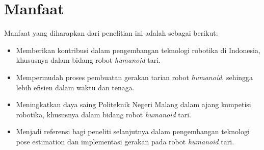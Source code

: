 \section{Manfaat}
Manfaat yang diharapkan dari penelitian ini adalah sebagai berikut:
\begin{itemize}
    \item Memberikan kontribusi dalam pengembangan teknologi robotika di Indonesia, khususnya dalam bidang robot \textit{humanoid} tari.
    \item Mempermudah proses pembuatan gerakan tarian robot \textit{humanoid}, sehingga lebih efisien dalam waktu dan tenaga.
    \item Meningkatkan daya saing Politeknik Negeri Malang dalam ajang kompetisi robotika, khususnya dalam bidang robot \textit{humanoid} tari.
    \item Menjadi referensi bagi peneliti selanjutnya dalam pengembangan teknologi pose estimation dan implementasi gerakan pada robot \textit{humanoid} tari.
\end{itemize}